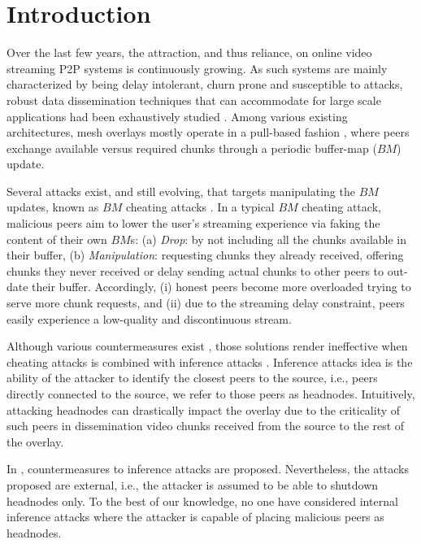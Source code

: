 \section{Introduction}
\label{sec:intro}



Over the last few years, the attraction, and thus reliance, on online video streaming P2P systems is continuously growing. 
As such systems are mainly characterized by being delay intolerant, churn prone and susceptible to attacks, robust data dissemination techniques that can accommodate for large scale applications had been exhaustively studied \cite{sasi2014survey}.
Among various existing architectures, mesh overlays mostly operate in a pull-based fashion \cite{zhang2014modeling}, where peers exchange available versus required chunks through a periodic buffer-map ($BM$) update.

Several attacks exist, and still evolving, that targets manipulating the $BM$ updates, known as $BM$ cheating attacks \cite{cheatingAnalysis}.
In a typical $BM$ cheating attack, malicious peers aim to lower the user's streaming experience via faking the content of their own $BM$s: 
(a) \textit{Drop}: by not including all the chunks available in their buffer, (b) \textit{Manipulation}: requesting chunks they already received, offering chunks they never received or delay sending actual chunks to other peers to out-date their buffer.
Accordingly, (i) honest peers become more overloaded trying to serve more chunk requests, and (ii) due to the streaming delay constraint, peers easily experience a low-quality and discontinuous stream.

Although various countermeasures exist \cite{zhang2005coolstreaming, defending2, antiliar}, those solutions render ineffective when cheating attacks is combined with inference attacks \cite{nguyen2016swap,4395124,rbcs}.
Inference attacks idea is the ability of the attacker to identify the closest peers to the source, i.e., peers directly connected to the source, we refer to those peers as headnodes.
Intuitively, attacking headnodes can drastically impact the overlay due to the criticality of such peers in dissemination video chunks received from the source to the rest of the overlay.

In \cite{nguyen2016swap, rbcs, nguyen2014resilience}, countermeasures to inference attacks are proposed. 
Nevertheless, the attacks proposed are external, i.e., the attacker is assumed to be able to shutdown headnodes only.
To the best of our knowledge, no one have considered internal inference attacks where the attacker is capable of placing malicious peers as headnodes.

